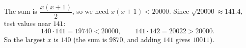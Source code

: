 The sum is $\dfrac{x(x+1)}{2}$, so we need $x(x+1)<20000$. Since $\sqrt{20000}\approx141.4$, test values near $141$:
\[140\cdot141=19740<20000,\qquad141\cdot142=20022>20000.\]
So the largest $x$ is $\boxed{140}$ (the sum is $9870$, and adding $141$ gives $10011$).
